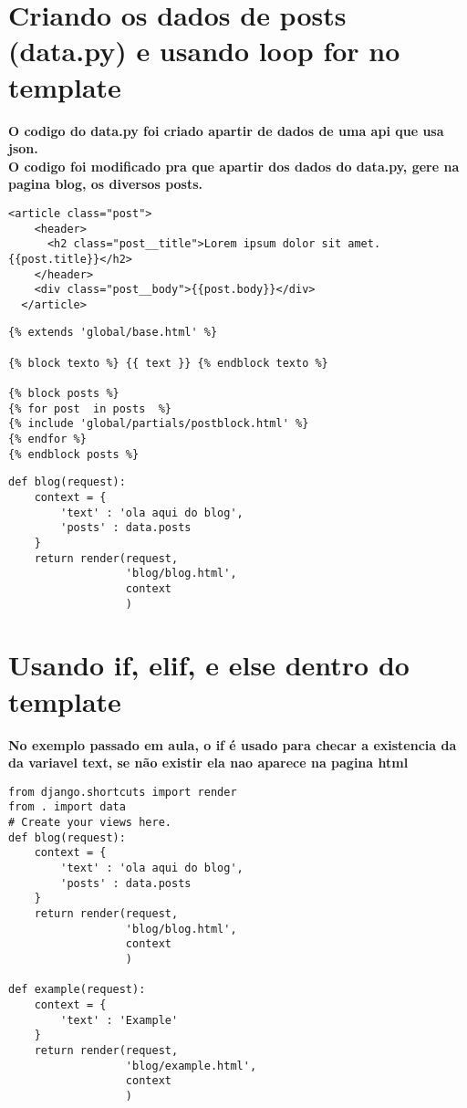 \documentclass{article}
\begin{document}
\section{Criando os dados de posts (data.py) e usando loop for no template}
\textbf{O codigo do data.py foi criado apartir de dados de uma api que usa json.}\\
\textbf{O codigo foi modificado pra que apartir dos dados do data.py, gere na pagina blog, os diversos posts.}
\begin{lstlisting}[style=htmlStyle, caption={base/global/partials/postblock.htmll}]
    <article class="post">
    <header>
      <h2 class="post__title">Lorem ipsum dolor sit amet.{{post.title}}</h2>
    </header>
    <div class="post__body">{{post.body}}</div>
  </article>
\end{lstlisting}

\begin{lstlisting}[style=htmlStyle, caption={blog/templates/blog/blog.html}]
{% extends 'global/base.html' %}

{% block texto %} {{ text }} {% endblock texto %}

{% block posts %}
{% for post  in posts  %}
{% include 'global/partials/postblock.html' %}
{% endfor %}
{% endblock posts %} 
\end{lstlisting}

\begin{lstlisting}[style=pythonStyle, caption={blog/views.py}]
    def blog(request):
    context = {
        'text' : 'ola aqui do blog',
        'posts' : data.posts
    }
    return render(request,
                  'blog/blog.html', 
                  context
                  )

\end{lstlisting}

\section{Usando if, elif, e else dentro do template}
\textbf{No exemplo passado em aula, o if é usado para checar a existencia da da variavel text, se não existir ela nao aparece na pagina html}

\begin{lstlisting}[style=pythonStyle, caption={blog/views.py}]
    from django.shortcuts import render
from . import data
# Create your views here.
def blog(request):
    context = {
        'text' : 'ola aqui do blog',
        'posts' : data.posts
    }
    return render(request,
                  'blog/blog.html', 
                  context
                  )

def example(request):
    context = {
        'text' : 'Example'
    }
    return render(request, 
                  'blog/example.html', 
                  context
                  )

\end{lstlisting}
\end{document}
